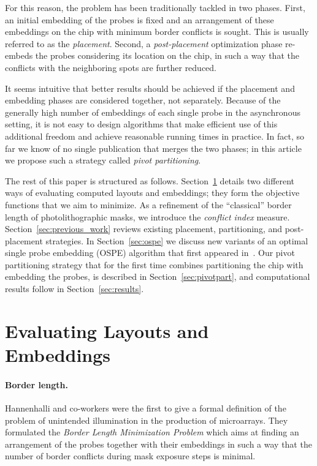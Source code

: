 \documentclass{llncs}
\begin{document}
For this reason, the problem has been traditionally tackled in two phases.
First, an initial embedding of the probes is fixed and an arrangement of these
embeddings on the chip with minimum border conflicts is sought. This is
usually referred to as the \emph{placement}. Second, a \emph{post-placement}
optimization phase re-embeds the probes considering its location on the chip,
in such a way that the conflicts with the neighboring spots are further
reduced.

It seems intuitive that better results should be achieved if the placement and
embedding phases are considered together, not separately. Because of the
generally high number of embeddings of each single probe in the asynchronous
setting, it is not easy to design algorithms that make efficient use of this
additional freedom and achieve reasonable running times in practice. In fact,
so far we know of no single publication that merges the two phases; in this
article we propose such a strategy called \emph{pivot partitioning}.


The rest of this paper is structured as follows. Section~\ref{sec:eval}
details two different ways of evaluating computed layouts and embeddings; they
form the objective functions that we aim to minimize. As a refinement of the
``classical'' border length of photolithographic masks, we introduce the
\emph{conflict index} measure. Section~\ref{sec:previous_work} reviews
existing placement, partitioning, and post-placement strategies.  In
Section~\ref{sec:ospe} we discuss new variants of an optimal single probe
embedding (OSPE) algorithm that first appeared in~\cite{KAHNG02}. Our pivot
partitioning strategy that for the first time combines partitioning the chip
with embedding the probes, is described in Section~\ref{sec:pivotpart}, and
computational results follow in Section~\ref{sec:results}.



\section{Evaluating Layouts and Embeddings}
\label{sec:eval}

\paragraph{Border length.}
Hannenhalli and co-workers \cite{HANNENHALLI02} were the first to give a
formal definition of the problem of unintended illumination in the production
of microarrays. They formulated the \emph{Border Length Minimization Problem}
which aims at finding an arrangement of the probes together with their
embeddings in such a way that the number of border conflicts during mask
exposure steps is minimal.
\end{document}
